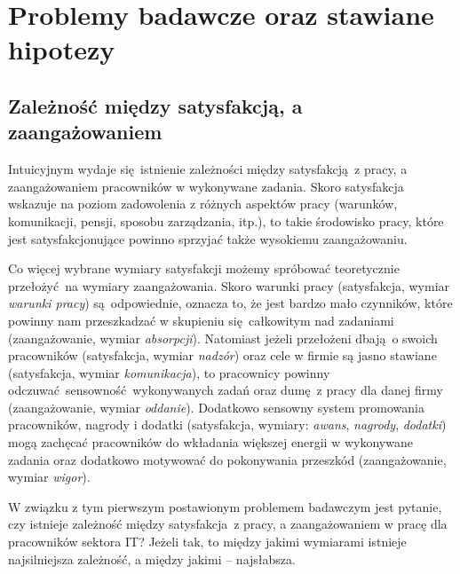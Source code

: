 \chapter{Problemy badawcze oraz stawiane hipotezy}
\section{Zależność między satysfakcją, a zaangażowaniem}
\label{sec:hypothesis-relation}
Intuicyjnym wydaje się istnienie zależności między satysfakcją z pracy, a zaangażowaniem pracowników w wykonywane zadania. Skoro satysfakcja wskazuje na poziom zadowolenia z różnych aspektów pracy (warunków, komunikacji, pensji, sposobu zarządzania, itp.), to takie środowisko pracy, które jest satysfakcjonujące powinno sprzyjać także wysokiemu zaangażowaniu. 

Co więcej wybrane wymiary satysfakcji możemy spróbować teoretycznie przełożyć na wymiary zaangażowania. Skoro warunki pracy (satysfakcja, wymiar \textit{warunki pracy}) są odpowiednie, oznacza to, że jest bardzo mało czynników, które powinny nam przeszkadzać w skupieniu
się całkowitym nad zadaniami (zaangażowanie, wymiar \textit{absorpcji}). Natomiast jeżeli przełożeni dbają o swoich pracowników (satysfakcja, wymiar \textit{nadzór}) oraz cele w firmie są jasno stawiane (satysfakcja, wymiar \textit{komunikacja}), to pracownicy powinny odczuwać sensowność wykonywanych zadań oraz dumę z pracy dla danej firmy (zaangażowanie, wymiar \textit{oddanie}). Dodatkowo sensowny system promowania pracowników, nagrody i dodatki (satysfakcja, wymiary: \textit{awans},
\textit{nagrody}, \textit{dodatki}) mogą zachęcać pracowników do wkładania większej energii w wykonywane zadania oraz dodatkowo motywować do pokonywania przeszkód (zaangażowanie, wymiar \textit{wigor}).

W związku z tym pierwszym postawionym problemem badawczym jest pytanie, czy istnieje zależność między satysfakcja z pracy, a zaangażowaniem w pracę dla pracowników sektora IT? Jeżeli tak, to między jakimi wymiarami istnieje najsilniejsza zależność, a między jakimi -- najsłabsza.

